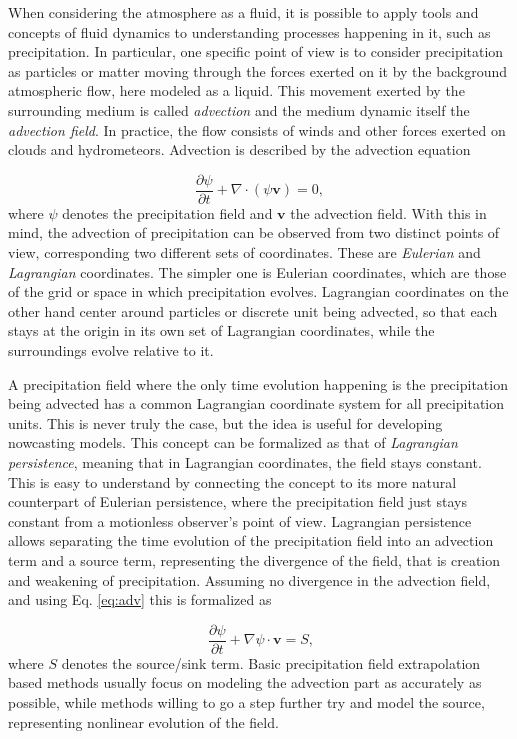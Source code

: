 When considering the atmosphere as a fluid, it is possible to apply tools and concepts of fluid dynamics to understanding processes happening in it, such as precipitation. In particular, one specific point of view is to consider precipitation as particles or matter moving through the forces exerted on it by the background atmospheric flow, here modeled as a liquid. This movement exerted by the surrounding medium is called \textit{advection} and the medium dynamic itself the \textit{advection field}. In practice, the flow consists of winds and other forces exerted on clouds and hydrometeors. Advection is described by the advection equation

\begin{equation}
	\label{eq:adv}
	\frac{\partial \psi}{\partial t} + \nabla \cdot (\psi \pmb{v}) = 0,
\end{equation}
%
where $\psi$ denotes the precipitation field and $\pmb{v}$ the advection field. With this in mind, the advection of precipitation can be observed from two distinct points of view, corresponding two different sets of coordinates. These are \textit{Eulerian} and \textit{Lagrangian} coordinates. The simpler one is Eulerian coordinates, which are those of the grid or space in which precipitation evolves. Lagrangian coordinates on the other hand center around particles or discrete unit being advected, so that each stays at the origin in its own set of Lagrangian coordinates, while the surroundings evolve relative to it. 

A precipitation field where the only time evolution happening is the precipitation being advected has a common Lagrangian coordinate system for all precipitation units. This is never truly the case, but the idea is useful for developing nowcasting models. This concept can be formalized as that of \textit{Lagrangian persistence}, meaning that in Lagrangian coordinates, the field stays constant. This is easy to understand by connecting the concept to its more natural counterpart of Eulerian persistence, where the precipitation field just stays constant from a motionless observer's point of view. Lagrangian persistence allows separating the time evolution of the precipitation field into an advection term and a source term, representing the divergence of the field, that is creation and weakening of precipitation. Assuming no divergence in the advection field, and using Eq. \eqref{eq:adv} this is formalized as 

\begin{equation}
\
\frac{\partial \psi}{\partial t} + \nabla \psi \cdot \pmb{v} = S,
\end{equation}
%
where $S$ denotes the source/sink term. Basic precipitation field extrapolation based methods usually focus on modeling the advection part as accurately as possible, while methods willing to go a step further try and model the source, representing nonlinear evolution of the field. 

